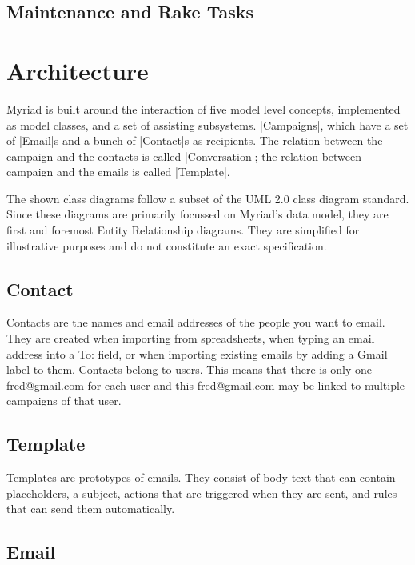\subsection{Maintenance and Rake Tasks}


\pagebreak
\section{Architecture}

Myriad is built around the interaction of five model level concepts, implemented as model classes, and a set of assisting subsystems.
|Campaigns|, which have a set of |Email|s and a bunch of |Contact|s as recipients. The relation between the campaign and the contacts is called |Conversation|; the relation between campaign and the emails is called |Template|.

The shown class diagrams follow a subset of the UML 2.0 class diagram standard\cite{uml}. Since these diagrams are primarily focussed on Myriad's data model, they are first and foremost Entity Relationship diagrams. They are simplified for illustrative purposes and do not constitute an exact specification.



\subsection{Contact}

Contacts are the names and email addresses of the people you want to email.
They are created when importing from spreadsheets, when typing an email address into a To: field, or when importing existing emails by adding a Gmail label to them. Contacts belong to users. This means that there is only one fred@gmail.com for each user and this fred@gmail.com may be linked to multiple campaigns of that user.

\subsection{Template}

Templates are prototypes of emails. They consist of body text that can contain placeholders, a subject, actions that are triggered when they are sent, and rules that can send them automatically.

\subsection{Email}

